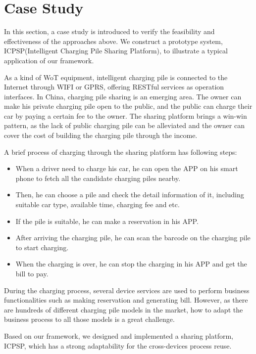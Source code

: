 \section{Case Study}
\label{CaseStudy}
In this section, a case study is introduced to verify the feasibility and effectiveness of the approaches above. We construct a prototype system, ICPSP(Intelligent Charging Pile Sharing Platform), to illustrate a typical application of our framework. 

As a kind of WoT equipment, intelligent charging pile is connected to the Internet through WIFI or GPRS, offering RESTful services as operation interfaces. In China, charging pile sharing is an emerging area. The owner can make his private charging pile open to the public, and the public can charge their car by paying a certain fee to the owner. The sharing platform brings a win-win pattern, as the lack of public charging pile can be alleviated and the owner can cover the cost of building the charging pile through the income. 

A brief process of charging through the sharing platform has following steps:
\begin{itemize}
\setlength{\itemsep}{1pt}
\setlength{\parskip}{0pt}
\setlength{\parsep}{0pt}
\item When a driver need to charge his car, he can open the APP on his smart phone to fetch all the candidate charging piles nearby. 
\item Then, he can choose a pile and check the detail information of it, including suitable car type, available time, charging fee and etc. 
\item If the pile is suitable, he can make a reservation in his APP. 
\item After arriving the charging pile, he can scan the barcode on the charging pile to start charging. 
\item When the charging is over, he can stop the charging in his APP and get the bill to pay. 
\end{itemize}

During the charging process, several device services are used to perform business functionalities such as making reservation and generating bill. However, as there are hundreds of different charging pile models in the market, how to adapt the business process to all those models is a great challenge. 

Based on our framework, we designed and implemented a sharing platform, ICPSP, which has a strong adaptability for the cross-devices process reuse. 

